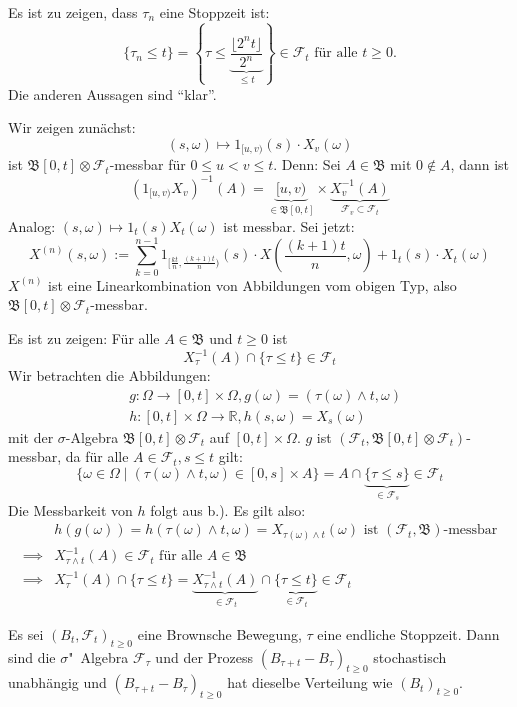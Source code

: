\documentclass[a4paper,twoside,DIV15,BCOR12mm]{scrbook}
\newcommand{\cF}{\mathcal F}
\newcommand{\borel}{{\mathfrak B}}
\begin{document}
\begin{beweis}
  \begin{enuma}
  \item Es ist zu zeigen, dass $\tau_n$ eine Stoppzeit ist:
\[
\{\tau_n\leq t\}=\left\{\tau\leq\underbrace{\frac{\lfloor 2^nt\rfloor}{2^n}}_{\leq t}\right\}\in\cF_t\text{ für alle }t\geq0.
  \]
Die anderen Aussagen sind ``klar''.
\item Wir zeigen zunächst:
\[
(s,\omega)\mapsto1_{[u,v)}(s)\cdot X_v(\omega)
\]
ist $\borel[0,t]\otimes\cF_t$-messbar für $0\leq u<v\leq t$. Denn: Sei $A\in\borel$ mit $0\notin A$, dann ist
\[
(1_{[u,v)}X_v)^{-1}(A)=\underbrace{[u,v)}_{\in\borel[0,t]}\times\underbrace{X_v^{-1}(A)}_{\cF_v\subset\cF_t}
\]
Analog: $(s,\omega)\mapsto1_{t}(s)X_t(\omega)$ ist messbar.
Sei jetzt: 
\[
X^{(n)}(s,\omega):=\sum_{k=0}^{n-1}1_{[\frac{kt}{n},\frac{(k+1)t}{n})}(s)\cdot X(\frac{(k+1)t}{n},\omega)+1_{t}(s)\cdot X_t(\omega)
\]
$X^{(n)}$ ist eine Linearkombination von Abbildungen vom obigen Typ, also $\borel[0,t]\otimes\cF_t$-messbar.
\item Es ist zu zeigen: Für alle $A\in\borel$ und $t\geq0$ ist
\[
X_{\tau}^{-1}(A)\cap\{\tau\leq t\}\in\cF_t
\]
Wir betrachten die Abbildungen:
\begin{align*}
  & g:\Omega\longrightarrow[0,t]\times\Omega ,g(\omega)=(\tau(\omega)\wedge t,\omega) \\
  & h:[0,t]\times\Omega\longrightarrow\mathbb R ,h(s,\omega)=X_s(\omega)
\end{align*}
mit der $\sigma$-Algebra $\borel[0,t]\otimes\cF_t$ auf $[0,t]\times\Omega$. $g$ ist $(\cF_t,\borel[0,t]\otimes\cF_t)$-messbar, da für alle $A\in\cF_t, s\leq t$ gilt:
\[
\{\omega\in\Omega\mid(\tau(\omega)\wedge t,\omega)\in[0,s]\times A\}=A\cap\underbrace{\{\tau\leq s\}}_{\in\cF_s}\in\cF_t
\]
Die Messbarkeit von $h$ folgt aus b.). Es gilt also:
\begin{align*}
  & h(g(\omega))=h(\tau(\omega)\wedge t,\omega)=X_{\tau(\omega)\wedge t}(\omega)\text{ ist $(\cF_t,\borel)$-messbar} \\
\implies & X_{\tau\wedge t}^{-1}(A)\in\cF_t\text{ für alle }A\in\borel \\
\implies & X_\tau^{-1}(A)\cap\{\tau\leq t\}=\underbrace{X_{\tau\wedge t}^{-1}(A)}_{\in\cF_t}\cap\underbrace{\{\tau\leq t\}}_{\in\cF_t}\in\cF_t
\end{align*}
  \end{enuma}
\end{beweis}
\begin{satz}
  \label{satz:13.2}
Es sei $(B_t,\cF_t)_{t\geq0}$ eine Brownsche Bewegung, $\tau$ eine endliche Stoppzeit. Dann sind die $\sigma$"~Algebra $\cF_\tau$ und der Prozess $(B_{\tau+t}-B_{\tau})_{t\geq0}$ stochastisch unabhängig und $(B_{\tau+t}-B_{\tau})_{t\geq0}$ hat dieselbe Verteilung wie $(B_t)_{t\geq0}$.
\end{satz}
\end{document}
